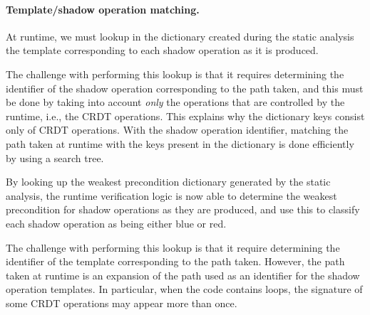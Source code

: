 \paragraph{Template/shadow operation matching.}
At runtime, we must lookup in the
dictionary created during the static analysis the template corresponding to 
each shadow operation as it is produced.

The challenge with performing this lookup is that it requires determining
the identifier of the shadow operation corresponding to the path taken, and this
must be done by taking into account \textit{only} the 
operations that are controlled by the runtime, i.e., the CRDT operations.
This explains why the dictionary keys consist only of CRDT operations.
With the shadow operation identifier, matching the path taken at runtime with the keys present 
in the dictionary is done efficiently by using a search tree.




By looking up the weakest precondition dictionary generated by the static analysis,
the runtime verification logic is now able to determine the 
weakest precondition for shadow operations as they are
produced, and use this to 
classify each shadow operation as being either blue or red.


The challenge with performing this lookup is that it require determining
the identifier  of the template corresponding to the path taken. However, the
path taken at runtime is an expansion of the path used as an
identifier for the shadow operation templates. In particular, when the code contains loops,
the signature of some CRDT operations may appear more than once.

